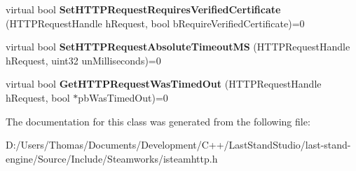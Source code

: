 \begin{DoxyCompactItemize}
\item 
\hypertarget{classISteamHTTP_adfba72d99eeaabb5ee231c6bf915837d}{}virtual bool {\bfseries Set\+H\+T\+T\+P\+Request\+Requires\+Verified\+Certificate} (H\+T\+T\+P\+Request\+Handle h\+Request, bool b\+Require\+Verified\+Certificate)=0\label{classISteamHTTP_adfba72d99eeaabb5ee231c6bf915837d}

\item 
\hypertarget{classISteamHTTP_a40ca210e9fd8a1d4a57a0856648a5ca3}{}virtual bool {\bfseries Set\+H\+T\+T\+P\+Request\+Absolute\+Timeout\+M\+S} (H\+T\+T\+P\+Request\+Handle h\+Request, uint32 un\+Milliseconds)=0\label{classISteamHTTP_a40ca210e9fd8a1d4a57a0856648a5ca3}

\item 
\hypertarget{classISteamHTTP_a92086a15c7a2929df9acf9398f1c0dd6}{}virtual bool {\bfseries Get\+H\+T\+T\+P\+Request\+Was\+Timed\+Out} (H\+T\+T\+P\+Request\+Handle h\+Request, bool $\ast$pb\+Was\+Timed\+Out)=0\label{classISteamHTTP_a92086a15c7a2929df9acf9398f1c0dd6}

\end{DoxyCompactItemize}


The documentation for this class was generated from the following file\+:\begin{DoxyCompactItemize}
\item 
D\+:/\+Users/\+Thomas/\+Documents/\+Development/\+C++/\+Last\+Stand\+Studio/last-\/stand-\/engine/\+Source/\+Include/\+Steamworks/isteamhttp.\+h\end{DoxyCompactItemize}
